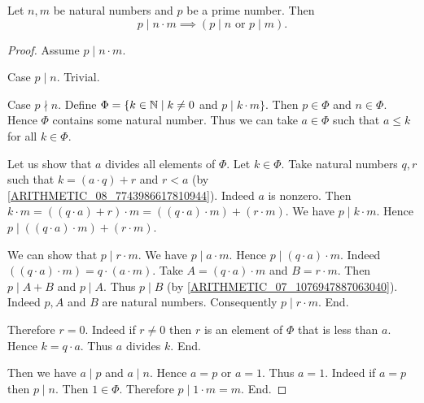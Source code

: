 \documentclass[10pt]{article}
\begin{document}
  \begin{forthel}
    \begin{proposition}
      Let $n, m$ be natural numbers and $p$ be a prime number.
      Then \[ p \mid n \cdot m \implies (\text{$p \mid n$ or $p \mid m$}). \]
    \end{proposition}
    \begin{proof}
      Assume $p \mid n \cdot m$.

      Case $p \mid n$. Trivial.

      Case $p \nmid n$.
        Define $\Phi = \{ k \in \mathbb{N} \mid k \neq 0$ and $p \mid k \cdot m \}$.
        Then $p \in \Phi$ and $n \in \Phi$.
        Hence $\Phi$ contains some natural number.
        Thus we can take $a \in \Phi$ such that $a \leq k$ for all $k \in \Phi$.

        Let us show that $a$ divides all elements of $\Phi$.
          Let $k \in \Phi$.
          Take natural numbers $q, r$ such that $k = (a \cdot q) + r$ and
          $r < a$ (by \cref{ARITHMETIC_08_7743986617810944}).
          Indeed $a$ is nonzero.
          Then $k \cdot m
            = ((q \cdot a) + r) \cdot m
            = ((q \cdot a) \cdot m) + (r \cdot m)$.
          We have $p \mid k \cdot m$.
          Hence $p \mid ((q \cdot a) \cdot m) + (r \cdot m)$.

          We can show that $p \mid r \cdot m$.
            We have $p \mid a \cdot m$.
            Hence $p \mid (q \cdot a) \cdot m$.
            Indeed $((q \cdot a) \cdot m) = q \cdot (a \cdot m)$. %
            Take $A = (q \cdot a) \cdot m$ and $B = r \cdot m$. %
            Then $p \mid A + B$ and $p \mid A$.
            Thus $p \mid B$ (by \cref{ARITHMETIC_07_1076947887063040}).
            Indeed $p, A$ and $B$ are natural numbers.
            Consequently $p \mid r \cdot m$.
          End.

          Therefore $r = 0$.
          Indeed if $r \neq 0$ then $r$ is an element of $\Phi$ that is less than $a$.
          Hence $k = q \cdot a$.
          Thus $a$ divides $k$.
        End.

        Then we have $a \mid p$ and $a \mid n$.
        Hence $a = p$ or $a = 1$.
        Thus $a = 1$.
        Indeed if $a = p$ then $p \mid n$.
        Then $1 \in \Phi$.
        Therefore $p \mid 1 \cdot m = m$.
      End.
    \end{proof}
  \end{forthel}
\end{document}
